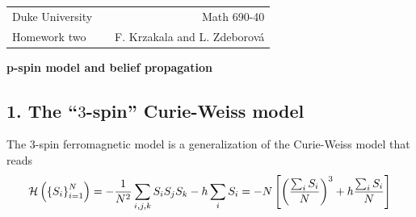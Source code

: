 \documentclass[a4paper,oneside,12pt]{article}
\begin{document}
\noindent

\begin{tabular}{lcr}
  Duke University & & Math 690-40 \\  
  Homework two & \hspace{6.3cm} & F. Krzakala and L. Zdeborov\'a\\ \hline
\end{tabular}

\begin{center}
  {\Large {\bf p-spin model and belief propagation}}
\end{center}




\subsection*{1. The ``$ 3 $-spin'' Curie-Weiss model}
The 3-spin ferromagnetic model is a generalization of the Curie-Weiss model that reads
\begin{equation*}
    \mathcal{H} \left(  \left\lbrace  S_i  \right\rbrace_{i=1}^N  \right) = -\frac{1}{N^2} \sum_{i,j,k} S_i S_j S_k - h \sum_i S_i
    = -N \left\lbrack  \left(  \frac{\sum_i S_i}{N}  \right)^3 + h \frac{\sum_i S_i}{N}  \right\rbrack
\end{equation*}
\end{document}
